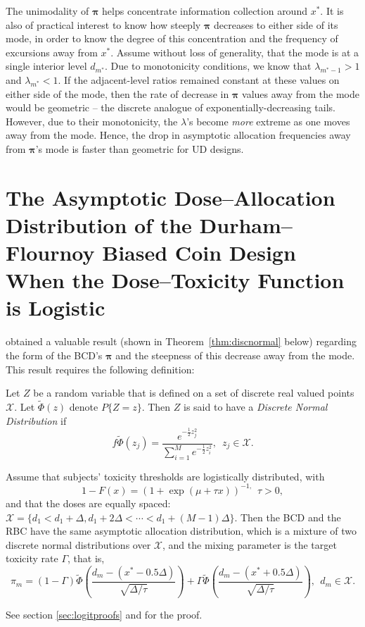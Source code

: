 The unimodality of $\boldsymbol{\pi}$ helps concentrate information collection around $x^*$. It is also of practical interest to know how steeply $\boldsymbol{\pi}$ decreases to either side of its mode, in order to know the degree of this concentration and the frequency of excursions away from $x^*$. Assume without loss of generality, that the mode is at a single interior level $d_{m^*}$. Due to monotonicity conditions, we know that $\lambda_{m^*-1}>1$ and $\lambda_{m^*}<1$. If the adjacent-level ratios remained constant at these values on either side of the mode, then the rate of decrease in $\boldsymbol{\pi}$ values away from the mode would be geometric -- the discrete analogue of exponentially-decreasing tails. However, due to their monotonicity, the $\lambda$'s become \emph{more} extreme as one moves away from the mode. Hence, the drop in asymptotic allocation frequencies away from $\boldsymbol{\pi}$'s mode is faster than geometric for UD designs.


\section{The Asymptotic Dose--Allocation Distribution of the Durham--Flournoy Biased Coin Design When the Dose--Toxicity Function is Logistic}\label{sec:logistic}
\cite{Durh:Flou:rand:1994} obtained a valuable result (shown in Theorem~\ref{thm:discnormal} below) regarding the form of the BCD's $\boldsymbol{\pi}$ and the steepness of this decrease away from the mode. This result requires the following definition:
\begin{defn}
Let $Z$ be a random variable that is defined on a set of discrete
real valued points $\mathcal{X}$.  Let $\tilde{\Phi}(z)$ denote $P\{Z=z\}$.  Then $Z$ is said to have a \emph{Discrete Normal Distribution} if
\begin{equation*}f
\tilde{\Phi}(z_j)=\frac{e^{-\frac{1}{2}z_j^2}}{\sum_{i=1}^Me^{-\frac{1}{2}z_i^2}},\,\,\,z_j\in\mathcal{X}.
\end{equation*}
\end{defn}
\begin{thm}\label{thm:discnormal}
Assume that subjects' toxicity thresholds are logistically distributed, with $$1-F(x)=(1+\exp(\mu+\tau x))^{-1,}\ \ \tau>0,$$ and that the doses are equally spaced: $\mathcal{X}=\{d_1<d_1+\Delta,d_1+2\Delta<\cdots<d_1+(M-1)\Delta\}.$ Then the BCD and the RBC have the same asymptotic allocation distribution, which is a mixture of two discrete normal distributions over $\mathcal{X}$,  and  the mixing parameter is the target toxicity rate $\Gamma$, that is,
%
\begin{equation}\label{eq:discnormal}
\pi_m=(1-\Gamma)\tilde{\Phi}\left(\frac{d_m-(x^*-0.5\Delta)}{\sqrt{\Delta/\tau}}\right)+
\Gamma\tilde{\Phi}\left(\frac{d_m-(x^*+0.5\Delta)}{\sqrt{\Delta/\tau}}\right),\ \ d_m\in\mathcal{X}.
\end{equation}
\end{thm}
%
See section \ref{sec:logitproofs} and \cite{Durh:Flou:rand:1994} for the proof.

